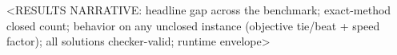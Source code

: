 <RESULTS NARRATIVE: headline gap across the benchmark; exact-method closed count;
behavior on any unclosed instance (objective tie/beat + speed factor); all
solutions checker-valid; runtime envelope>


